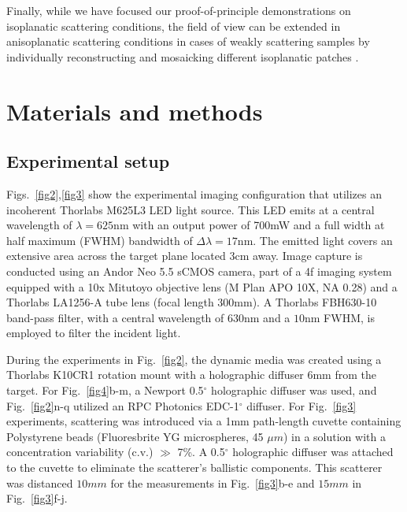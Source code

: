 \documentclass[pdflatex,sn-mathphys-num]{sn-jnl}%
\theoremstyle{thmstyleone}%
\theoremstyle{thmstyletwo}%
\theoremstyle{thmstylethree}%
\begin{document}
Finally, while we have focused our proof-of-principle demonstrations on isoplanatic scattering conditions, the field of view can be extended in anisoplanatic scattering conditions in cases of weakly scattering samples by individually reconstructing and mosaicking different isoplanatic patches \cite{trussell1978sectioned,alterman2021imaging,lee22,najar2024harnessing,sunray2024beyond}.



\section*{Materials and methods}

\subsection*{Experimental setup}

Figs.~\ref{fig2},\ref{fig3} show the experimental imaging configuration that utilizes an incoherent Thorlabs M625L3 LED light source. This LED emits at a central wavelength of $\lambda = 625$nm with an output power of 700mW and a full width at half maximum (FWHM) bandwidth of $\Delta \lambda = 17$nm. The emitted light covers an extensive area across the target plane located 3cm away. Image capture is conducted using an Andor Neo 5.5 sCMOS camera, part of a 4f imaging system equipped with a 10x Mitutoyo objective lens (M Plan APO 10X, NA 0.28) and a Thorlabs LA1256-A tube lens (focal length $300$mm). A Thorlabs FBH630-10 band-pass filter, with a central wavelength of $630$nm and a $10$nm FWHM, is employed to filter the incident light.

During the experiments in Fig.~\ref{fig2}, the dynamic media was created using a Thorlabs K10CR1 rotation mount with a holographic diffuser 6mm from the target. For Fig.~\ref{fig4}b-m, a Newport 0.5$^\circ$ holographic diffuser was used, and Fig.~\ref{fig2}n-q utilized an RPC Photonics EDC-1$^\circ$ diffuser.
For Fig.~\ref{fig3} experiments, scattering was introduced via a 1mm path-length cuvette containing Polystyrene beads (Fluoresbrite YG microspheres, 45 $\mu m$) in a solution with a concentration variability (c.v.) $\gg$ 7\%. A 0.5$^\circ$ holographic diffuser was attached to the cuvette to eliminate the scatterer's ballistic components. This scatterer was distanced $10mm$ for the measurements in Fig.~\ref{fig3}b-e and $15mm$ in Fig.~\ref{fig3}f-j.
\end{document}
